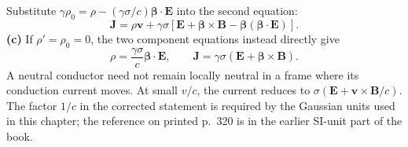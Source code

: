 Substitute $\gamma\rho_0=\rho-(\gamma\sigma/c)
\boldsymbol\beta\cdot\mathbf E$ into the second equation:
\[
\boxed{\mathbf J=\rho\mathbf v+\gamma\sigma
[\mathbf E+\boldsymbol\beta\times\mathbf B
-\boldsymbol\beta(\boldsymbol\beta\cdot\mathbf E)].}
\]
\textbf{(c)} If $\rho'=\rho_0=0$, the two component equations
instead directly give
\[
\boxed{\rho=\frac{\gamma\sigma}{c}\boldsymbol\beta\cdot\mathbf E,
\qquad\mathbf J=\gamma\sigma(\mathbf E+
\boldsymbol\beta\times\mathbf B).}
\]
A neutral conductor need not remain locally neutral in a frame
where its conduction current moves. At small $v/c$, the current
reduces to $\sigma(\mathbf E+\mathbf v\times\mathbf B/c)$.
The factor $1/c$ in the corrected statement is required by the
Gaussian units used in this chapter; the reference on printed
p.~320 is in the earlier SI-unit part of the book.

